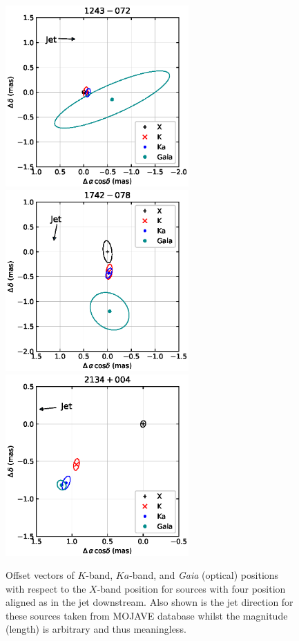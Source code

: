 \documentclass{aa}
\begin{document}
\begin{appendix}
\begin{figure}[hbtp]
        \includegraphics[width=70mm]{figs/1243-072}
        \includegraphics[width=70mm]{figs/1742-078}
        \includegraphics[width=70mm]{figs/2134+004}
        \caption[]{\label{fig:jet-down}
            Offset vectors of $K$-band, $Ka$-band, and {\it Gaia} (optical) positions with respect to the $X$-band position for sources with four position aligned as in the jet downstream.
            Also shown is the jet direction for these sources taken from MOJAVE database whilst the magnitude (length) is arbitrary and thus meaningless.
        }
    \end{figure}


\end{appendix}
\end{document}
